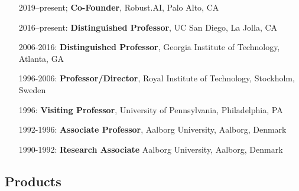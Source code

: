 \documentclass[svgnames,11pt]{article}
\begin{document}
\begin{itemize}[label={--9999:},leftmargin=*,itemsep=0pt]
    \item[2019--present;]
        \textbf{Co-Founder}, Robust.AI, Palo Alto, CA
        \item[2016--present:] \textbf{Distinguished Professor},
        UC San Diego, La Jolla, CA

    \item[2006-2016:] \textbf{Distinguished Professor},
        Georgia Institute of Technology,
        Atlanta, GA

    \item[1996-2006:]
        \textbf{Professor/Director},
        Royal Institute of Technology,
        Stockholm, Sweden 

    \item[1996:]
        \textbf{Visiting Professor},
        University of Pennsylvania,
        Philadelphia, PA
        
    \item[1992-1996:]
      \textbf{Associate Professor},
        Aalborg University,
        Aalborg, Denmark
        
      \item[1990-1992:]
        \textbf{Research Associate}
        Aalborg University,
        Aalborg, Denmark

\end{itemize}

\subsection{Products}
\end{document}
